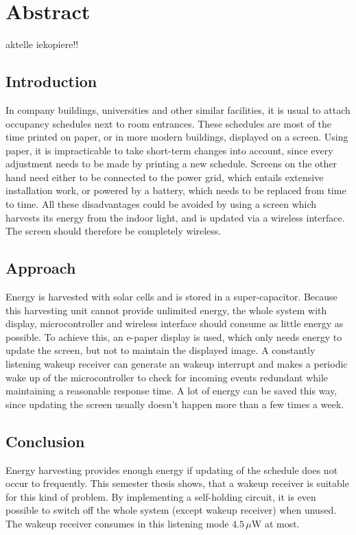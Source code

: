 \chapter*{Abstract}
aktelle iekopiere!!

\section*{Introduction}
In company buildings, universities and other similar facilities, it is usual to attach occupancy schedules next to room entrances. These schedules are most of the time printed on paper, or in more modern buildings, displayed on a screen. Using paper, it is impracticable to take short-term changes into account, since every adjustment needs to be made by printing a new schedule. Screens on the other hand need either to be connected to the power grid, which entails extensive installation work, or powered by a battery, which needs to be replaced from time to time. All these disadvantages could be avoided by using a screen which harvests its energy from the indoor light, and is updated via a wireless interface. The screen should therefore be completely wireless.

\section*{Approach}
Energy is harvested with solar cells and is stored in a super-capacitor.
Because this harvesting unit cannot provide unlimited energy, the whole system with display, microcontroller and wireless interface should consume as little energy as possible.
To achieve this, an e-paper display is used, which only needs energy to update the screen, but not to maintain the displayed image.
A constantly listening wakeup receiver can generate an wakeup interrupt and makes a periodic wake up of the microcontroller to check for incoming events redundant while maintaining a reasonable response time.
A lot of energy can be saved this way, since updating the screen usually doesn't happen more than a few times a week.

\section*{Conclusion}
Energy harvesting provides enough energy if updating of the schedule does not occur to frequently. This semester thesis shows, that a wakeup receiver is suitable for this kind of problem. By implementing a self-holding circuit, it is even possible to switch off the whole system (except wakeup receiver) when unused. The wakeup receiver consumes in this listening mode $4.5\,\mu\text{W}$ at most.